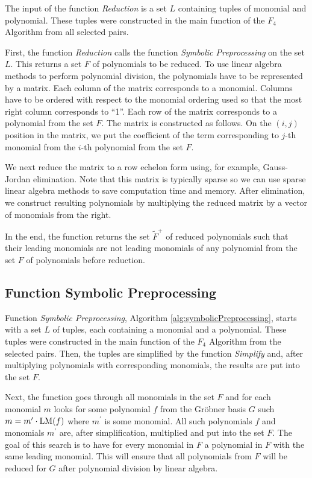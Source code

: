 The input of the function \textit{Reduction} is a set $L$ containing tuples of monomial and polynomial. These tuples were constructed in the main function of the $F_4$ Algorithm from all selected pairs.

First, the function \textit{Reduction} calls the function \textit{Symbolic Preprocessing} on the set $L$. This returns a set $F$ of polynomials to be reduced. To use linear algebra methods to perform polynomial division, the polynomials have to be represented by a matrix. Each column of the matrix corresponds to a monomial. Columns have to be ordered with respect to the monomial ordering used so that the most right column corresponds to ``1''. Each row of the matrix corresponds to a polynomial from the set $F$. The matrix is constructed as follows. On the $(i, j)$ position in the matrix, we put the coefficient of the term corresponding to $j$-th monomial from the $i$-th polynomial from the set $F$.

We next reduce the matrix to a row echelon form using, for example, Gauss-Jordan elimination. Note that this matrix is typically sparse so we can use sparse linear algebra methods to save computation time and memory. After elimination, we construct resulting polynomials by multiplying the reduced matrix by a vector of monomials from the right.

In the end, the function returns the set $\tilde{F}^+$ of reduced polynomials such that their leading monomials are not leading monomials of any polynomial from the set $F$ of polynomials before reduction.



\subsection{Function Symbolic Preprocessing}
Function \textit{Symbolic Preprocessing}, Algorithm \ref{alg:symbolicPreprocessing}, starts with a set $L$ of tuples, each containing a monomial and a polynomial. These tuples were constructed in the main function of the $F_4$ Algorithm from the selected pairs. Then, the tuples are simplified by the function \textit{Simplify} and, after multiplying polynomials with corresponding monomials, the results are put into the set $F$.

Next, the function goes through all monomials in the set $F$ and for each monomial $m$ looks for some polynomial $f$ from the Gr\"obner basis $G$ such $m = m^\prime \cdot\operatorname{LM}(f)$ where $m^\prime$ is some monomial. All such polynomials $f$ and monomials $m^\prime$ are, after simplification, multiplied and put into the set $F$. The goal of this search is to have for every monomial in $F$ a polynomial in $F$ with the same leading monomial. This will ensure that all polynomials from $F$ will be reduced for $G$ after polynomial division by linear algebra.

